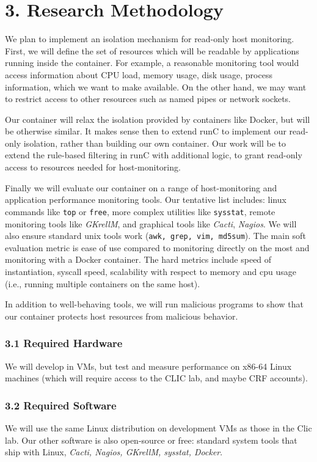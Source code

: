 \documentclass{proc}
\begin{document}
\section*{3. Research Methodology}
We plan to implement an isolation mechanism for read-only host monitoring. First, we will define the set of resources which will be readable by applications running inside the container. For example, a reasonable monitoring tool would access information about CPU load, memory usage, disk usage, process information, which we want to make available. On the other hand, we may want to restrict access to other resources such as named pipes or network sockets.

Our container will relax the isolation provided by containers like Docker, but will be otherwise similar. It makes sense then to extend runC to implement our read-only isolation, rather than building our own container. Our work will be to extend the rule-based filtering in runC with additional logic, to grant read-only access to resources needed for host-monitoring. 

Finally we will evaluate our container on a range of host-monitoring and application performance monitoring tools. Our tentative list includes: linux commands like \texttt{top} or \texttt{free}, more complex utilities like \texttt{sysstat}\cite{sysstat}, remote monitoring tools like \emph{GKrellM}\cite{gkrellm}, and graphical tools like \emph{Cacti}\cite{cacti}, \emph{Nagios}\cite{nagios}. We will also ensure standard unix tools work (\texttt{awk, grep, vim, md5sum}). The main soft evaluation metric is ease of use compared to monitoring directly on the most and monitoring with a Docker container. The hard metrics include speed of instantiation, syscall speed, scalability with respect to memory and cpu usage (i.e., running multiple containers on the same host). 

In addition to well-behaving tools, we will run malicious programs to show that our container protects host resources from malicious behavior.

\subsubsection*{3.1 Required Hardware}
We will develop in VMs, but test and measure performance on x86-64 Linux machines (which will require access to the CLIC lab, and maybe CRF accounts).

\subsubsection*{3.2 Required Software}
We will use the same Linux distribution on development VMs as those in the Clic lab. Our other software is also open-source or free: standard system tools that ship with Linux, \emph{Cacti, Nagios, GKrellM, sysstat, Docker}.
\end{document}
